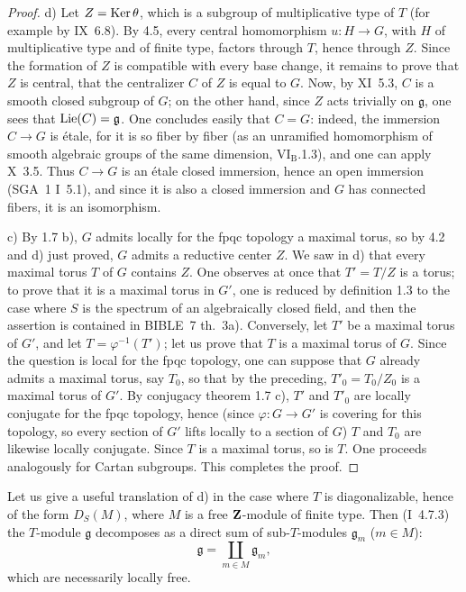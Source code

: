 \begin{proof}
d) Let $Z=\operatorname{Ker}\theta$, which is a subgroup of multiplicative type of $T$ (for example by IX~6.8). By 4.5, every central homomorphism $u:H\to G$, with $H$ of multiplicative type and of finite type, factors through $T$, hence through $Z$. Since the formation of $Z$ is compatible with every base change, it remains to prove that $Z$ is central, \ie that the centralizer $C$ of $Z$ is equal to $G$. Now, by XI~5.3, $C$ is a smooth closed subgroup of $G$; on the other hand, since $Z$ acts trivially on $\mathfrak g$, one sees that $\operatorname{Lie}(C)=\mathfrak g$. One concludes easily that $C=G$: indeed, the immersion $C\to G$ is étale, for it is so fiber by fiber (as an unramified homomorphism of smooth algebraic groups of the same dimension, VI$_{\mathrm B}$.1.3), and one can apply X~3.5. Thus $C\to G$ is an étale closed immersion, hence an open immersion (SGA~1 I~5.1), and since it is also a closed immersion and $G$ has connected fibers, it is an isomorphism.

c) By 1.7 b), $G$ admits locally for the fpqc topology a maximal torus, so by 4.2 and d) just proved, $G$ admits a reductive center $Z$. We saw in d) that every maximal torus $T$ of $G$ contains $Z$. One observes at once that $T'=T/Z$ is a torus; to prove that it is a maximal torus in $G'$, one is reduced by definition 1.3 to the case where $S$ is the spectrum of an algebraically closed field, and then the assertion is contained in BIBLE~7 th.~3a). Conversely, let $T'$ be a maximal torus of $G'$, and let $T=\varphi^{-1}(T')$; let us prove that $T$ is a maximal torus of $G$. Since the question is local for the fpqc topology, one can suppose that $G$ already admits a maximal torus, say $T_0$, so that by the preceding, $T'_0=T_0/Z_0$ is a maximal torus of $G'$. By conjugacy theorem 1.7 c), $T'$ and $T'_0$ are locally conjugate for the fpqc topology, hence (since $\varphi:G\to G'$ is covering for this topology, so every section of $G'$ lifts locally to a section of $G$) $T$ and $T_0$ are likewise locally conjugate. Since $T$ is a maximal torus, so is $T$. One proceeds analogously for Cartan subgroups. This completes the proof.
\end{proof}

Let us give a useful translation of d) in the case where $T$ is diagonalizable, hence of the form $D_S(M)$, where $M$ is a free $\mathbf{Z}$-module of finite type. Then (I~4.7.3) the $T$-module $\mathfrak g$ decomposes as a direct sum of sub-$T$-modules $\mathfrak g_m$ ($m\in M$):
\[
\mathfrak g=\coprod_{m\in M}\mathfrak g_m,
\]
which are necessarily locally free.

